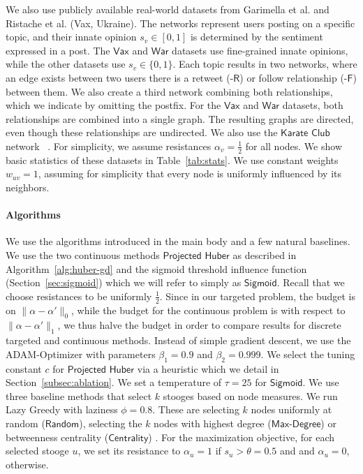We also use publicly available real-world datasets
from  Garimella et al. \cite{garimella18} and Ristache et al. \cite{ristache2024wiser} (\textsf{Vax}, \textsf{Ukraine}).
The networks represent users posting on
a specific topic, and their innate opinion
$s_v \in [0, 1]$ is determined by the
sentiment expressed in a post. The
$\textsf{Vax}$ and $\textsf{War}$ datasets
use fine-grained innate opinions, while
the other datasets use
$s_v \in \{0, 1\}$. Each topic
results in two networks, where an edge exists
between two users there is a retweet
($\textsf{-R}$) or
follow relationship ($\textsf{-F}$) 
between them. We also create a third
network combining both relationships,
which we indicate by omitting
the postfix.
For the $\textsf{Vax}$ and $\textsf{War}$
datasets, both relationships are combined
into a single graph.
The resulting graphs are directed, even
though these relationships are undirected.
%
We also use the $\textsf{Karate Club}$ network
~\cite{girvan2002community}.
%
For simplicity, we assume resistances 
$\alpha_v = \frac 1 2$ for all nodes.
%
We show basic statistics of these datasets
in Table~\ref{tab:stats}.
We use constant weights $w_{uv} = 1$,
assuming for simplicity
that every node is uniformly
influenced by its neighbors.

\paragraph{Algorithms}

We use the algorithms introduced in
the main body and a few natural
baselines. We use the two continuous
methods $\textsf{Projected Huber}$
as described in
Algorithm~\ref{alg:huber-gd}
and the sigmoid threshold influence function
(Section~\ref{sec:sigmoid})
which we will refer to simply
as $\textsf{Sigmoid}$.
Recall that we choose resistances
to be uniformly $\frac 1 2$.
Since in our targeted problem,
the budget is on
$\|\alpha - \alpha'\|_0$,
while the budget for the continuous
problem is with respect to
$\|\alpha - \alpha'\|_1$, we
thus halve the budget in order
to compare results for discrete
targeted and continuous methods.
Instead of simple gradient
descent, we use the ADAM-Optimizer
with parameters $\beta_1 = 0.9$
and $\beta_2 = 0.999$.
We select the tuning constant $c$
for $\textsf{Projected Huber}$ via
a heuristic which we detail in
Section~\ref{subsec:ablation}.
We set a temperature
of $\tau=25$ for $\textsf{Sigmoid}$.
We use three baseline methods that
select $k$ stooges based on node
measures.
We run \textsf{Lazy Greedy}
with laziness $\phi=0.8$.
These are selecting
$k$ nodes uniformly at random
($\textsf{Random}$), selecting
the $k$ nodes with highest degree
($\textsf{Max-Degree}$) or
betweenness centrality
($\textsf{Centrality}$) \cite{freeman1977}.
For the maximization
objective, for each selected
stooge $u$, we set its resistance
to $\alpha_u = 1$ if $s_u > \theta = 0.5$
and and $\alpha_u = 0$, otherwise.


